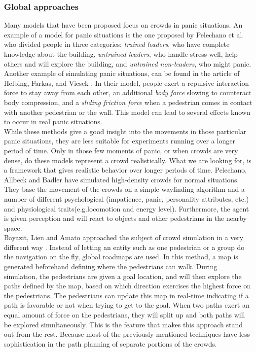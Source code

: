 \documentclass[11pt]{book}
\begin{document}
\subsubsection{Global approaches}
Many models that have been proposed focus on crowds in panic situations. An example of a model for panic situations is the one proposed by Pelechano et al. \cite{citeulike1080090} who divided people in three categories: \emph{trained leaders}, who have complete knowledge about the building, \emph{untrained leaders}, who handle stress well, help others and will explore the building, and \emph{untrained non-leaders}, who might panic.  Another example of simulating panic situations, can be found in the article of Helbing, Farkas, and Vicsek \cite{citeulike1656038}. In their model, people exert a repulsive interaction force to stay away from each other, an additional \emph{body force} slowing to counteract body compression, and a \emph{sliding friction force} when a pedestrian comes in contact with another pedestrian or the wall. This model can lead to several effects known to occur in real panic situations.\\
While these methods give a good insight into the movements in those particular panic situations, they are less suitable for experiments running over a longer period of time. Only in those few moments of panic, or when crowds are very dense, do these models represent a crowd realistically. What we are looking for, is a framework that gives realistic behavior over longer periods of time. Pelechano, Allbeck and Badler \cite{Pelechano:2007:CIA:1272690.1272705} have simulated high-density crowds for normal situations. They base the movement of the crowds on a simple wayfinding algorithm and a number of different psychological (impatience, panic, personality attributes, etc.) and physiological traits(e.g.locomotion and energy level). Furthermore, the agent is given perception and will react to objects and other pedestrians in the nearby space.\\
Bayazit, Lien and Amato approached the subject of crowd simulation in a very different way \cite{Bayazit02bettergroup}. Instead of letting an entity such as one pedestrian or a group do the navigation on the fly, global roadmaps are used. In this method, a map is generated beforehand defining where the pedestrians can walk. During simulation, the pedestrians are given a goal location, and will then explore the paths defined by the map, based on which direction exercises the highest force on the pedestrians. The pedestrians can update this map in real-time indicating if a path is favorable or not when trying to get to the goal. When two paths exert an equal amount of force on the pedestrians, they will split up and both paths will be explored simultaneously. This is the feature that makes this approach stand out from the rest. Because most of the previously mentioned techniques have less sophistication in the path planning of separate portions of the crowds. %
\end{document}
